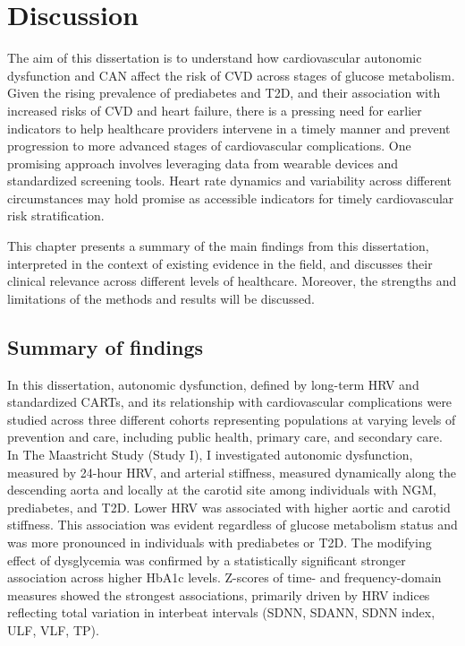 \documentclass[
  a4paper,
  headsepline=true,
  open=left]{scrbook}
\begin{document}

\hypertarget{discussion}{%
\chapter{Discussion}\label{discussion}}

\clearpage
\null
\thispagestyle{empty}
\clearpage

The aim of this dissertation is to understand how cardiovascular
autonomic dysfunction and CAN affect the risk of CVD across stages of
glucose metabolism. Given the rising prevalence of prediabetes and T2D,
and their association with increased risks of CVD and heart failure,
there is a pressing need for earlier indicators to help healthcare
providers intervene in a timely manner and prevent progression to more
advanced stages of cardiovascular complications. One promising approach
involves leveraging data from wearable devices and standardized
screening tools. Heart rate dynamics and variability across different
circumstances may hold promise as accessible indicators for timely
cardiovascular risk stratification.

This chapter presents a summary of the main findings from this
dissertation, interpreted in the context of existing evidence in the
field, and discusses their clinical relevance across different levels of
healthcare. Moreover, the strengths and limitations of the methods and
results will be discussed.

\newpage

\hypertarget{summary-of-findings}{%
\section{Summary of findings}\label{summary-of-findings}}

In this dissertation, autonomic dysfunction, defined by long-term HRV
and standardized CARTs, and its relationship with cardiovascular
complications were studied across three different cohorts representing
populations at varying levels of prevention and care, including public
health, primary care, and secondary care. In The Maastricht Study (Study
I), I investigated autonomic dysfunction, measured by 24-hour HRV, and
arterial stiffness, measured dynamically along the descending aorta and
locally at the carotid site among individuals with NGM, prediabetes, and
T2D. Lower HRV was associated with higher aortic and carotid stiffness.
This association was evident regardless of glucose metabolism status and
was more pronounced in individuals with prediabetes or T2D. The
modifying effect of dysglycemia was confirmed by a statistically
significant stronger association across higher HbA1c levels. Z-scores of
time- and frequency-domain measures showed the strongest associations,
primarily driven by HRV indices reflecting total variation in interbeat
intervals (SDNN, SDANN, SDNN index, ULF, VLF, TP).
\end{document}
